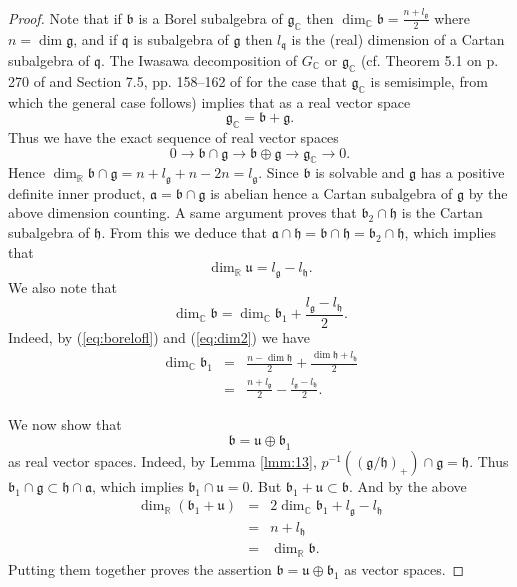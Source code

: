 \documentclass{amse-new}
\numberwithin{equation}{section} %
\begin{document}
\begin{proof}
Note that if $\mathfrak{b}$ is a Borel subalgebra of $\mathfrak{g}%
_{\mathbb{C}}$ then $\dim_{\mathbb{C}}\mathfrak{b=}\frac{n+l_{\mathfrak{g}}%
}{2}$ where $n=\dim\mathfrak{g}$, and  if $\mathfrak{q}$ is subalgebra of
$\mathfrak{g}$ then $l_{\mathfrak{q}}$ is the (real) dimension of a Cartan subalgebra
of $\mathfrak{q}$. The Iwasawa decomposition of $G_{\mathbb{C}}$ or $\mathfrak{g}_{\mathbb{C}}$ (cf. Theorem 5.1 on p. 270 of \cite{Helgason} and Section 7.5, pp. 158--162 of \cite{Wallach} for the case that $\mathfrak{g}_{\mathbb{C}}$ is semisimple, from which the general case follows) implies that
as a real vector space%
\[
\mathfrak{g}_{\mathbb{C}}=\mathfrak{b+\mathfrak{g.}}%
\]
Thus we have the exact sequence of real vector spaces%
\[
0\rightarrow\mathfrak{b\cap\mathfrak{g\rightarrow}b\oplus
\mathfrak{g\rightarrow\mathfrak{g}}}_{\mathbb{C}}\rightarrow0.
\]
Hence $\dim_{\mathbb{R}}\mathfrak{b\cap\mathfrak{g}}=n+l_{\mathfrak{g}%
}+n-2n=l_{\mathfrak{g}}$. Since $\mathfrak{b}$ is solvable and $\mathfrak{g}$
has a positive definite inner product, $\mathfrak{a=b\cap\mathfrak{g}}$ is
abelian hence a Cartan subalgebra of $\mathfrak{g}$ by the above dimension counting. A same argument proves that $\mathfrak{b}%
_{2}\cap\mathfrak{h}$ is the Cartan subalgebra of $\mathfrak{h}$. From this we deduce that $\mathfrak{a}\cap \mathfrak{h}=\mathfrak{b}\cap \mathfrak{h}=\mathfrak{b}_2\cap \mathfrak{h}$, which implies that $$\dim_{\mathbb{R}}\mathfrak{u}= l_\mathfrak{g}-l_\mathfrak{h}.$$
 We also note that%
\[
\dim_{\mathbb{C}}\mathfrak{b}=\dim_{\mathbb{C}}\mathfrak{b}_{1}+\frac
{l_{\mathfrak{g}}-l_{\mathfrak{h}}}{2}.
\]
Indeed, by (\ref{eq:borelofl}) and (\ref{eq:dim2}) we have
\begin{eqnarray*}
\dim_{\mathbb{C}}\mathfrak{b}_{1}&=&\frac{n-\dim\mathfrak{h}}{2}+\frac
{\dim\mathfrak{h}+l_{\mathfrak{h}}}{2}
\\
&=&\frac{n+l_{\mathfrak{g}}}{2}-\frac{l_{\mathfrak{g}}-l_{\mathfrak{h}}}{2}.
\end{eqnarray*}


We now show that
\[
\mathfrak{b=\mathfrak{u\oplus\mathfrak{b}}}_{1}%
\]
as real vector spaces. Indeed, by Lemma \ref{lmm:13}, $p^{-1}((\mathfrak{g}/\mathfrak{h})_{+})%
\cap\mathfrak{g=\mathfrak{h}}$. Thus $\mathfrak{b}_{1}\cap\mathfrak{g\subset
\mathfrak{h\cap\mathfrak{a}}}$, which implies  $\mathfrak{b}_{1}\cap\mathfrak{u}=0$. But
$\mathfrak{b}_{1}+\mathfrak{u\subset\mathfrak{b}}$. And by the above%
\begin{eqnarray*}
\dim_{\mathbb{R}}\left( \mathfrak{b}_{1}+\mathfrak{u}\right)  &=&2\dim
_{\mathbb{C}}\mathfrak{b}_{1}+l_{\mathfrak{g}}-l_{\mathfrak{h}}\\
&=&n+l_{\mathfrak{h}}\\
&=&\dim_{\mathbb{R}}\mathfrak{b}.
\end{eqnarray*}
Putting them together proves  the assertion $\mathfrak{b}=\mathfrak{u}\oplus\mathfrak{b}_{1}$ as vector spaces.


\end{proof}
\end{document}
